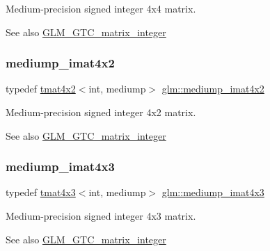Medium-\/precision signed integer 4x4 matrix. \begin{DoxySeeAlso}{See also}
\hyperlink{group__gtc__matrix__integer}{G\+L\+M\+\_\+\+G\+T\+C\+\_\+matrix\+\_\+integer} 
\end{DoxySeeAlso}
\mbox{\label{group__gtc__matrix__integer_gabfe107153637dfd7a0c272ff1ba892ed}} 
\subsubsection{\texorpdfstring{mediump\+\_\+imat4x2}{mediump\_imat4x2}}
{\footnotesize\ttfamily typedef \hyperlink{structglm_1_1tmat4x2}{tmat4x2}$<$int, mediump$>$ \hyperlink{group__gtc__matrix__integer_gabfe107153637dfd7a0c272ff1ba892ed}{glm\+::mediump\+\_\+imat4x2}}

Medium-\/precision signed integer 4x2 matrix. \begin{DoxySeeAlso}{See also}
\hyperlink{group__gtc__matrix__integer}{G\+L\+M\+\_\+\+G\+T\+C\+\_\+matrix\+\_\+integer} 
\end{DoxySeeAlso}
\mbox{\label{group__gtc__matrix__integer_ga0da8b13e141337d016a6541ea2c0362c}} 
\subsubsection{\texorpdfstring{mediump\+\_\+imat4x3}{mediump\_imat4x3}}
{\footnotesize\ttfamily typedef \hyperlink{structglm_1_1tmat4x3}{tmat4x3}$<$int, mediump$>$ \hyperlink{group__gtc__matrix__integer_ga0da8b13e141337d016a6541ea2c0362c}{glm\+::mediump\+\_\+imat4x3}}

Medium-\/precision signed integer 4x3 matrix. \begin{DoxySeeAlso}{See also}
\hyperlink{group__gtc__matrix__integer}{G\+L\+M\+\_\+\+G\+T\+C\+\_\+matrix\+\_\+integer} 
\end{DoxySeeAlso}
\mbox{\label{group__gtc__matrix__integer_gae226af929e72730be59a58d89a4be028}} 
